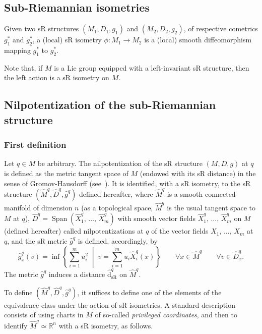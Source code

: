 \documentclass[10pt]{amsart}
\theoremstyle{definition}\newtheorem{defi}[theo]{Definition}\newtheorem{rema}[theo]{Remark}\newtheorem{exam}[theo]{Example}\newtheorem{exem}[theo]{Example}\newtheorem{nota}[theo]{Notation}
\newcommand*\R{\mathbb{R}}
\DeclareMathOperator{\Span}{Span}
\newcommand{\hatdsR}{\widehat{\mathrm{d}}_{\mathrm{sR}}}
\let\oldforall\forall
\renewcommand*{\forall}{\mathrel{\oldforall}}
\begin{document}
\subsection{Sub-Riemannian isometries}
Given two sR structures $(M_1,D_1,g_1)$ and $(M_2,D_2,g_2)$, of respective cometrics $g^*_1$ and $g^*_2$, a (local) sR isometry $\phi:M_1\rightarrow M_2$ is a (local) smooth diffeomorphism mapping $g^*_1$ to $g^*_2$.



Note that, if $M$ is a Lie group equipped with a left-invariant sR structure, then the left action is a sR isometry on $M$.


\subsection{Nilpotentization of the sub-Riemannian structure}\label{sec:nilp}
\subsubsection{First definition}
Let $q\in M$ be arbitrary. The nilpotentization of the sR structure $(M,D,g)$ at $q$ is defined as the metric tangent space of $M$ (endowed with its sR distance) in the sense of Gromov-Hausdorff (see~\cite{Bellaiche,Gromov}). It is identified, with a sR isometry, to the sR structure $(\widehat{M}^{q},\widehat{D}^{q},\widehat{g}^{q})$ defined hereafter, where $\widehat{M}^{q}$ is a smooth connected manifold of dimension $n$ (as a topological space, $\widehat{M}^{q}$ is the usual tangent space to $M$ at $q$), $\widehat{D}^{q}=\Span(\widehat{X}^{q}_1,\,\ldots,\,\widehat{X}^{q}_m)$ with smooth vector fields $\widehat{X}^{q}_1,\,\ldots,\,\widehat{X}^{q}_m$ on $M$ (defined hereafter) called nilpotentizations at $q$ of the vector fields $X_1,\,\ldots,\,X_m$ at $q$, and the sR metric $\widehat{g}^{q}$ is defined, accordingly, by
\[
\widehat{g}^{q}_x(v) = \inf \left\{ \sum_{i=1}^m u_i^2 \; \middle| \; v = \sum_{i=1}^m u_i \widehat{X}^{q}_i(x) \right\}\qquad \forall x\in \widehat{M}^{q}\qquad \forall v\in \widehat{D}^{q}_x.
\]
The metric $\widehat{g}^{q}$ induces a distance $\hatdsR^{q}$ on $\widehat{M}^{q}$.

To define $(\widehat{M}^{q},\widehat{D}^{q},\widehat{g}^{q})$, it suffices to define one of the elements of the equivalence class under the action of sR isometries. A standard description consists of using charts in $M$ of so-called \emph{privileged coordinates}, and then to identify $\widehat{M}^{q}\simeq\R^n$ with a sR isometry, as follows.
\end{document}

